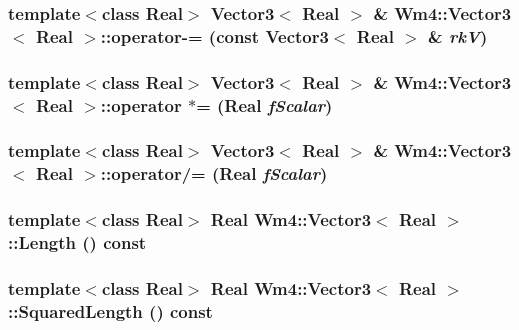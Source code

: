 \subsubsection{\setlength{\rightskip}{0pt plus 5cm}template$<$class Real$>$ {\bf Vector3}$<$ Real $>$ \& {\bf Wm4::Vector3}$<$ Real $>$::operator-= (const {\bf Vector3}$<$ Real $>$ \& {\em rk\-V})\hspace{0.3cm}{\tt  [inline]}}\label{classWm4_1_1Vector3_1f4f8be55361c48ce563410ca3fa1f9e}


\subsubsection{\setlength{\rightskip}{0pt plus 5cm}template$<$class Real$>$ {\bf Vector3}$<$ Real $>$ \& {\bf Wm4::Vector3}$<$ Real $>$::operator $\ast$= (Real {\em f\-Scalar})\hspace{0.3cm}{\tt  [inline]}}\label{classWm4_1_1Vector3_5bc60c9ce1bee914f39aeea3ae0294e4}


\subsubsection{\setlength{\rightskip}{0pt plus 5cm}template$<$class Real$>$ {\bf Vector3}$<$ Real $>$ \& {\bf Wm4::Vector3}$<$ Real $>$::operator/= (Real {\em f\-Scalar})\hspace{0.3cm}{\tt  [inline]}}\label{classWm4_1_1Vector3_908362502ff0c1f68d407566903c647f}


\subsubsection{\setlength{\rightskip}{0pt plus 5cm}template$<$class Real$>$ Real {\bf Wm4::Vector3}$<$ Real $>$::Length () const\hspace{0.3cm}{\tt  [inline]}}\label{classWm4_1_1Vector3_e5d946478a3e33ad6d85fafa8da99bb1}


\subsubsection{\setlength{\rightskip}{0pt plus 5cm}template$<$class Real$>$ Real {\bf Wm4::Vector3}$<$ Real $>$::Squared\-Length () const\hspace{0.3cm}{\tt  [inline]}}\label{classWm4_1_1Vector3_2b406327430121a450911b17f960c5b4}


